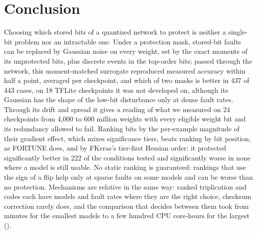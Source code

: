 \section{Conclusion}\label{sec:conclusion}
Choosing which stored bits of a quantized network to protect is neither a single-bit problem nor an intractable one. Under a protection mask, stored-bit faults can be replaced by Gaussian noise on every weight, set by the exact moments of its unprotected bits, plus discrete events in the top-order bits; passed through the network, this moment-matched surrogate reproduced measured accuracy within half a point, averaged per checkpoint, and which of two masks is better in 437 of 443 cases, on 18 TFLite checkpoints it was not developed on, although its Gaussian has the shape of the low-bit disturbance only at dense fault rates. Through its drift and spread it gives a reading of what we measured on 24 checkpoints from 4,000 to 600 million weights with every eligible weight bit and its redundancy allowed to fail. Ranking bits by the per-example magnitude of their gradient effect, which mixes significance tiers, beats ranking by bit position, as FORTUNE does, and by FKeras's tier-first Hessian order: it protected significantly better in 222 of the conditions tested and significantly worse in none where a model is still usable. No static ranking is guaranteed: rankings that use the sign of a flip help only at sparse faults on some models and can be worse than no protection. Mechanisms are relative in the same way: ranked triplication and codes each have models and fault rates where they are the right choice, checksum correction rarely does, and the comparison that decides between them took from minutes for the smallest models to a few hundred CPU core-hours for the largest ().
